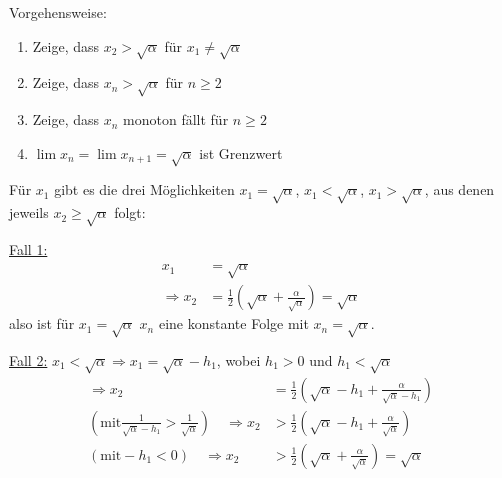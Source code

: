 \begin{lsg}  

Vorgehensweise:
\begin{enumerate}
    \item Zeige, dass $x_2 > \sqrt{\alpha}$ für $x_1 \neq \sqrt{\alpha}$
    \item Zeige, dass $x_n > \sqrt{\alpha}$ für $n \geq 2$
    \item Zeige, dass $x_n$ monoton fällt für $n \geq 2$
    \item $\lim x_n = \lim x_{n+1} = \sqrt{\alpha}$ ist Grenzwert
\end{enumerate}

Für $x_1$ gibt es die drei Möglichkeiten $x_1 = \sqrt{\alpha}$, $x_1 < \sqrt{\alpha}$, $x_1 > \sqrt{\alpha}$, aus denen jeweils $x_2 \geq \sqrt{\alpha}$ folgt:

\noindent
\underline{Fall 1:} 
\begin{align*}
x_1 &= \sqrt{\alpha} \\
\Rightarrow x_2 &= \frac{1}{2} \left( \sqrt{\alpha} + \frac{\alpha}{\sqrt{\alpha}} \right) = \sqrt{\alpha}
\end{align*}
 also ist für $x_1 = \sqrt{\alpha}$ $x_n$ eine konstante Folge mit $x_n = \sqrt{\alpha}$.

\noindent
\underline{Fall 2:} $x_1 < \sqrt{\alpha} \Rightarrow x_1 = \sqrt{\alpha} - h_1$, wobei $h_1 > 0$ und $h_1 < \sqrt\alpha$
\begin{align*}
\Rightarrow x_2 &= \frac{1}{2} \left( \sqrt{\alpha} - h_1 + \frac{\alpha}{\sqrt{\alpha} - h_1} \right) \\
\left(\text{mit} \frac{1}{\sqrt{\alpha} - h_1} > \frac{1}{\sqrt{\alpha}}\right)\quad \Rightarrow x_2 &> \frac{1}{2} \left( \sqrt{\alpha} - h_1 + \frac{\alpha}{\sqrt{\alpha}} \right) \\
(\text{mit} -h_1 < 0)\quad \Rightarrow x_2 &> \frac{1}{2} \left( \sqrt{\alpha} + \frac{\alpha}{\sqrt{\alpha}} \right) = \sqrt{\alpha}
\end{align*}



\end{lsg}
